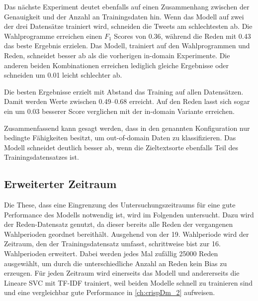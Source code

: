 Das nächste Experiment deutet ebenfalls auf einen Zusammenhang zwischen der Genauigkeit und der Anzahl an Trainingsdaten hin. Wenn das Modell auf zwei der drei Datensätze trainiert wird, schneiden die Tweets am schlechtesten ab. Die Wahlprogramme erreichen einen \(F_1\) Scores von \num{0.36}, während die Reden mit \num{0.43} das beste Ergebnis erzielen. Das Modell, trainiert auf den Wahlprogrammen und Reden, schneidet besser ab als die vorherigen in-domain Experimente. Die anderen beiden Kombinationen erreichen lediglich gleiche Ergebnisse oder schneiden um \num{0.01} leicht schlechter ab.

Die besten Ergebnisse erzielt mit Abstand das Training auf allen Datensätzen. Damit werden Werte zwischen \numrange{0.49}{0.68} erreicht. Auf den Reden lasst sich sogar ein um \num{0.03} besserer Score verglichen mit der in-domain Variante erreichen.

Zusammenfassend kann gesagt werden, dass \ft in den genannten Konfiguration nur bedingte Fähigkeiten besitzt, um out-of-domain Daten zu klassifizieren. Das Modell schneidet deutlich besser ab, wenn die Zieltextsorte ebenfalls Teil des Trainingsdatensatzes ist.

\subsection{Erweiterter Zeitraum}

Die These, dass eine Eingrenzung des Untersuchungszeitraums für eine gute Performance des Modells notwendig ist, wird im Folgenden untersucht. Dazu wird der Reden-Datensatz genutzt, da dieser bereits alle Reden der vergangenen Wahlperioden geordnet bereithält. Ausgehend von der \num{19}. Wahlperiode wird der Zeitraum, den der Trainingsdatensatz umfasst, schrittweise bist zur \num{16}. Wahlperioden erweitert. Dabei werden jedes Mal zufällig \num{25000} Reden ausgewählt, um durch die unterschiedliche Anzahl an Reden kein Bias zu erzeugen. Für jeden Zeitraum wird einerseits das \ft Modell und andererseits die Lineare \ac{SVC} mit \ac{TF-IDF} trainiert, weil beiden Modelle schnell zu trainieren sind und eine vergleichbar gute Performance in \autoref{ch:crispDm_2} aufweisen.

